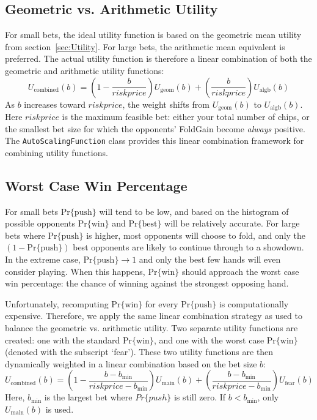 \subsection{Geometric vs. Arithmetic Utility}
\label{sec:GeomAlgb}

For small bets, the ideal utility function is based on the geometric mean utility from section~\ref{sec:Utility}.
For large bets, the arithmetic mean equivalent is preferred.
The actual utility function is therefore a linear combination of both the geometric and arithmetic utility functions:
\[
U_{\mathrm{combined}}(b) = \left(1 - \frac{b}{riskprice}\right) U_{\mathrm{geom}}(b) + \left(\frac{b}{riskprice}\right) U_{\mathrm{algb}}(b)
\]
As $b$ increases toward $riskprice$, the weight shifts from $U_{\mathrm{geom}}(b)$ to $U_{\mathrm{algb}}(b)$.
Here $riskprice$ is the maximum feasible bet: either your total number of chips, or the smallest bet size for which the opponents' FoldGain become \emph{always} positive.
The \texttt{AutoScalingFunction} class provides this linear combination framework for combining utility functions.

\subsection{Worst Case Win Percentage}
\label{sec:statworse}

For small bets $\mathrm{Pr\{push\}}$ will tend to be low, and based on the histogram of possible opponents $\mathrm{Pr\{win\}}$ and $\mathrm{Pr\{best\}}$ will be relatively accurate.
For large bets where $\mathrm{Pr\{push\}}$ is higher, most opponents will choose to fold, and only the $\left(1 - \mathrm{Pr\{push\}} \right)$ best opponents are likely to continue through to a showdown.
In the extreme case, $\mathrm{Pr\{push\}} \rightarrow 1$ and only the best few hands will even consider playing.
When this happens, $\mathrm{Pr\{win\}}$ should approach the worst case win percentage: the chance of winning against the strongest opposing hand.

Unfortunately, recomputing $\mathrm{Pr\{win\}}$ for every $\mathrm{Pr\{push\}}$ is computationally expensive.
Therefore, we apply the same linear combination strategy as used to balance the geometric vs. arithmetic utility.
Two separate utility functions are created: one with the standard $\mathrm{Pr\{win\}}$, and one with the worst case $\mathrm{Pr\{win\}}$ (denoted with the subscript `fear').
These two utility functions are then dynamically weighted in a linear combination based on the bet size $b$:
\[
U_{\mathrm{combined}}(b) = \left(1 - \frac{b - b_{\mathrm{min}}}{riskprice - b_{\mathrm{min}}}\right) U_{\mathrm{main}}(b) + \left(\frac{b - b_{\mathrm{min}}}{riskprice - b_{\mathrm{min}}}\right) U_{\mathrm{fear}}(b)
\]
Here, $b_{\mathrm{min}}$ is the largest bet where $Pr\{push\}$ is still zero.
If $b < b_{\mathrm{min}}$, only $U_{\mathrm{main}}(b)$ is used.


